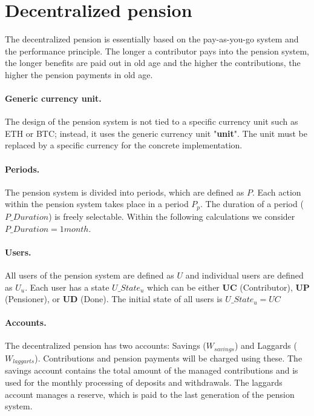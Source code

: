 \section{Decentralized pension}
The decentralized pension is essentially based on the pay-as-you-go system and the
performance principle. The longer a contributor pays into the pension system, 
the longer benefits are paid out in old age and the higher the contributions,
the higher the pension payments in old age.

\paragraph{Generic currency unit.} The design of the pension system is not tied to a specific currency unit such as ETH or BTC; instead, it uses the generic currency unit "\textbf{unit}". The unit must be replaced by a specific currency for the concrete implementation.

\paragraph{Periods.} The pension system is divided into periods, which are defined as $P$. Each action within the pension system takes place in a period $P_{p}$. The duration of a period ($P\_Duration$) is freely selectable. Within the following calculations we consider $P\_Duration = 1 month$.

\paragraph{Users.} All users of the pension system are defined as $U$ and individual users are defined as $U_{u}$. Each user has a state $U\_State_{u}$ which can be either \textbf{UC} (Contributor),
\textbf{UP} (Pensioner), or \textbf{UD} (Done).
The initial state of all users is $U\_State_{u} = UC$ 

\paragraph{Accounts.} The decentralized pension has two accounts: Savings ($W_{savings}$) and Laggards  ($W_{laggarts}$). Contributions and pension payments will be charged using these. The savings account contains the total amount of the managed contributions and is used for the monthly processing of deposits and withdrawals. The laggards account manages a reserve, which is paid to the last generation of the pension system.

